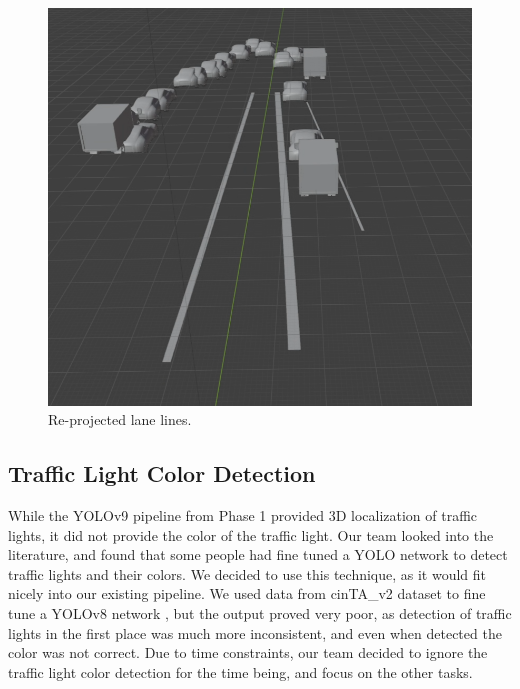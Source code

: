 \begin{figure}
    \centering
    \includegraphics[width=0.95\linewidth]{images/reprojected_lanes.png}
    \caption{Re-projected lane lines.}
    \label{fig:reprojected_lane_lines}
\end{figure}

\subsection{Traffic Light Color Detection}
While the YOLOv9 pipeline from Phase 1 provided 3D localization of traffic lights, it did not provide the color of the traffic light. Our team looked into the literature, and found that some people had fine tuned a YOLO network to detect traffic lights and their colors. We decided to use this technique, as it would fit nicely into our existing pipeline. We used data from cinTA\_v2 dataset to fine tune a YOLOv8 network \cite{CintaV2Dataset}, but the output proved very poor, as detection of traffic lights in the first place was much more inconsistent, and even when detected the color was not correct. Due to time constraints, our team decided to ignore the traffic light color detection for the time being, and focus on the other tasks. 

